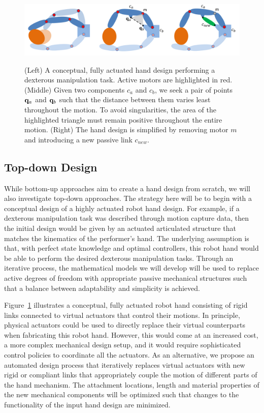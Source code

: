 \begin{figure}
\begin{center}
{\includegraphics[width=6in]{./figs/handDesign.png}}
\end{center}
\vspace*{-0.25in}
\caption[]{\small (Left) A conceptual, fully actuated hand design performing a dexterous manipulation task. Active motors are highlighted in red. (Middle) Given two components $c_a$ and $c_b$, we seek a pair of points $\mathbf{q}_a$ and $\mathbf{q}_b$ such that the distance between them varies least throughout the motion. To avoid singularities, the area of the highlighted triangle must remain positive throughout the entire motion. (Right) The hand design is simplified by removing motor $m$ and introducing a new passive link $c_{new}$.}
\label{handMechanismDesign}
\end{figure}

\subsection{Top-down Design}

While bottom-up approaches aim to create a hand design from scratch, we will also investigate top-down approaches. The strategy here will be to begin with a conceptual design of a highly actuated robot hand design. For example, if a dexterous manipulation task was described through motion capture data, then the initial design would be given by an actuated articulated structure that matches the kinematics of the performer's hand. The underlying assumption is that, with perfect state knowledge and optimal controllers, this robot hand would be able to perform the desired dexterous manipulation tasks. Through an iterative process, the mathematical models we will develop will be used to replace active degrees of freedom with appropriate passive mechanical structures such that a balance between adaptability and simplicity is achieved. 

Figure~\ref{handMechanismDesign} illustrates a conceptual, fully actuated robot hand consisting of rigid links connected to virtual actuators that control their motions. In principle, physical actuators could be used to directly replace their virtual counterparts when fabricating this robot hand. However, this would come at an increased cost, a more complex mechanical design setup, and it would require sophisticated control policies to coordinate all the actuators. As an alternative, we propose an automated design process that iteratively replaces virtual actuators with new rigid or compliant links that appropriately couple the motion of different parts of the hand mechanism. The attachment locations, length and material properties of the new mechanical components will be optimized such that changes to the functionality of the input hand design are minimized. 

